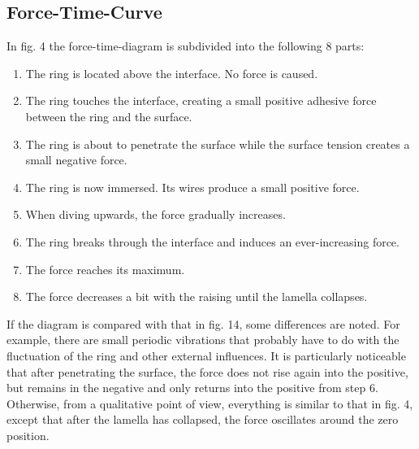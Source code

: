         \subsection{Force-Time-Curve}\label{sec:A1 force time curve}%
            In fig. 4 the force-time-diagram is subdivided into the following 8 parts:
            \begin{enumerate}
                \item The ring is located above the interface. No force is caused.
                \item The ring touches the interface, creating a small positive adhesive force between the ring and the surface.
                \item The ring is about to penetrate the surface while the surface tension creates a small negative force.
                \item The ring is now immersed. Its wires produce a small positive force.
                \item When diving upwards, the force gradually increases.
                \item The ring breaks through the interface and induces an ever-increasing force.
                \item The force reaches its maximum.
                \item The force decreases a bit with the raising until the lamella collapses.
            \end{enumerate}
            If the diagram is compared with that in fig. 14, some differences are noted. For example, there are small
            periodic vibrations that probably have to do with the fluctuation of the ring and other external influences.
            It is particularly noticeable that after penetrating the surface, the force does not rise again into the
            positive, but remains in the negative and only returns into the positive from step 6. Otherwise, from a
            qualitative point of view, everything is similar to that in fig. 4, except that after the lamella has
            collapsed, the force oscillates around the zero position.
